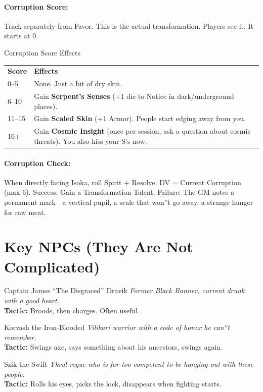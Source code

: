 \documentclass[11pt]{article}
\begin{document}
\paragraph{Corruption Score:}
Track separately from Favor. This is the actual transformation. Players see it. It starts at 0.

\begin{mechanicsbox}{Corruption Score Effects}
\begin{tabular}{ll}
\textbf{Score} & \textbf{Effects} \\
0--5 & None. Just a bit of dry skin. \\
6--10 & Gain \textbf{Serpent's Senses} (+1 die to Notice in dark/underground places). \\
11--15 & Gain \textbf{Scaled Skin} (+1 Armor). People start edging away from you. \\
16+ & Gain \textbf{Cosmic Insight} (once per session, ask a question about cosmic threats). You also hiss your S's now.
\end{tabular}
\end{mechanicsbox}

\paragraph{Corruption Check:}
When directly facing Isoka, roll Spirit + Resolve. DV = Current Corruption (max 6). Success: Gain a Transformation Talent. Failure: The GM notes a permanent mark---a vertical pupil, a scale that won''t go away, a strange hunger for raw meat.

\section*{Key NPCs (They Are Not Complicated)}

\begin{npcbox}{Captain James ``The Disgraced'' Dravik}
\textit{Former Black Banner, current drunk with a good heart.} \\
\textbf{Tactic:} Broods, then charges. Often useful.
\end{npcbox}

\begin{npcbox}{Korvash the Iron-Blooded}
\textit{Vilikari warrior with a code of honor he can``t remember.} \\
\textbf{Tactic:} Swings axe, says something about his ancestors, swings again.
\end{npcbox}

\begin{npcbox}{Szik the Swift}
\textit{Ykrul rogue who is far too competent to be hanging out with these people.} \\
\textbf{Tactic:} Rolls his eyes, picks the lock, disappears when fighting starts.
\end{npcbox}
\end{document}
